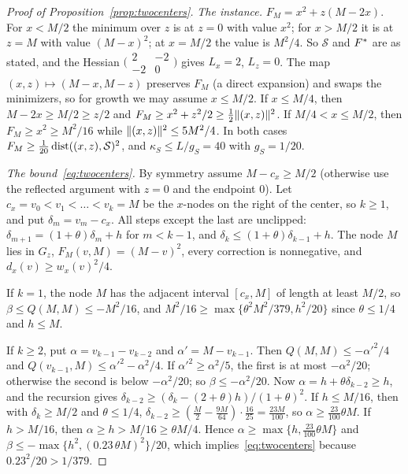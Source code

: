 \begin{proof}[Proof of Proposition~\ref{prop:twocenters}]
\emph{The instance.} $F_M=x^2+z(M-2x)$. For $x<M/2$ the minimum over $z$ is
at $z=0$ with value $x^2$; for $x>M/2$ it is at $z=M$ with value $(M-x)^2$;
at $x=M/2$ the value is $M^2/4$. So $\mathcal S$ and $F^{*}$ are as stated,
and the Hessian $\bigl(\begin{smallmatrix}2&-2\\-2&0\end{smallmatrix}\bigr)$
gives $L_x=2$, $L_z=0$. The map $(x,z)\mapsto(M-x,M-z)$ preserves $F_M$ (a
direct expansion) and swaps the minimizers, so for growth we may assume
$x\le M/2$. If $x\le M/4$, then $M-2x\ge M/2\ge z/2$ and
$F_M\ge x^2+z^2/2\ge\frac12\lVert (x,z)\rVert^2$. If $M/4<x\le M/2$, then
$F_M\ge x^2\ge M^2/16$ while $\lVert (x,z)\rVert^2\le5M^2/4$. In both cases
$F_M\ge\frac1{20}\operatorname{dist}((x,z),\mathcal S)^2$, and
$\kappa_S\le L/g_S=40$ with $g_S=1/20$.

\emph{The bound~\eqref{eq:twocenters}.} By symmetry assume $M-c_x\ge M/2$
(otherwise use the reflected argument with $z=0$ and the endpoint $0$). Let
$c_x=v_0<v_1<\dots<v_k=M$ be the $x$-nodes on the right of the center, so
$k\ge1$, and put $\delta_m=v_m-c_x$. All steps except the last are unclipped:
$\delta_{m+1}=(1+\theta)\delta_m+h$ for $m<k-1$, and
$\delta_k\le(1+\theta)\delta_{k-1}+h$. The node $M$ lies in $G_z$,
$F_M(v,M)=(M-v)^2$, every correction is nonnegative, and
$d_x(v)\ge w_x(v)^2/4$.

If $k=1$, the node $M$ has the adjacent interval $[c_x,M]$ of length at least
$M/2$, so $\beta\le Q(M,M)\le-M^2/16$, and
$M^2/16\ge\max\{\theta^2M^2/379,h^2/20\}$ since $\theta\le1/4$ and $h\le M$.

If $k\ge2$, put $\alpha=v_{k-1}-v_{k-2}$ and $\alpha'=M-v_{k-1}$. Then
$Q(M,M)\le-\alpha'^2/4$ and $Q(v_{k-1},M)\le\alpha'^2-\alpha^2/4$. If
$\alpha'^2\ge\alpha^2/5$, the first is at most $-\alpha^2/20$; otherwise the
second is below $-\alpha^2/20$; so $\beta\le-\alpha^2/20$. Now
$\alpha=h+\theta\delta_{k-2}\ge h$, and the recursion gives
$\delta_{k-2}\ge(\delta_k-(2+\theta)h)/(1+\theta)^2$. If $h\le M/16$, then
with $\delta_k\ge M/2$ and $\theta\le1/4$,
$\delta_{k-2}\ge(\frac M2-\frac{9M}{64})\cdot\frac{16}{25}=\frac{23M}{100}$, so
$\alpha\ge\frac{23}{100}\theta M$. If $h>M/16$, then
$\alpha\ge h>M/16\ge\theta M/4$. Hence $\alpha\ge\max\{h,\frac{23}{100}\theta M\}$
and $\beta\le-\max\{h^2,(0.23\,\theta M)^2\}/20$, which
implies~\eqref{eq:twocenters} because $0.23^2/20>1/379$.


\end{proof}

